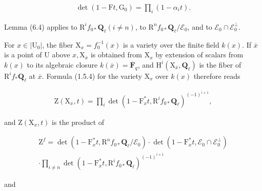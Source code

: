 \documentclass[10pt,leqno]{article}
\begin{document}
\begin{equation*}\begin{gathered}\operatorname{det}(1- \mathrm{F}t,\mathrm{G}_{0})=\prod _{i}(1- \alpha _{i} t).\end{gathered}\end{equation*}

\noindent Lemma (6.4) applies to \(\mathrm{R}^{i} f_{0*}\mathbf{Q}_{\ell } (i\ne n)\), to \(\mathrm{R}^{n} f_{0*}\mathbf{Q}_{\ell }/\mathcal{E} _{0}\), and to \(\mathcal{E} _{0}\cap \mathcal{E} _{0}^{\perp }\).\par

\noindent For \(x\in |\mathrm{U}_{0}|\), the fiber \(\mathrm{X}_{x}=f_{0}^{- 1}(x)\) is a variety over the finite field \(k(x)\). If \(\overline{x}\) is a point of \(\mathrm{U}\) above \(x, \mathrm{X}_{\overline{x}}\) is obtained from \(\mathrm{X}_{x}\) by extension of scalars from \(k(x)\) to its algebraic closure \(k(\overline{x})=\overline{\mathbf{F}}_{q}\), and \(\mathrm{H}^{i}(\mathrm{X}_{\overline{x}},\mathbf{Q}_{\ell })\) is the fiber of \(\mathrm{R}^{i} f_{*}\mathbf{Q}_{\ell }\) at \(\overline{x}\). Formula (1.5.4) for the variety \(\mathrm{X}_{x}\) over \(k(x)\) therefore reads\par

\begin{equation*}\begin{gathered}\mathrm{Z}(\mathrm{X}_{x},t)=\prod _{i} \operatorname{det}(1- \mathrm{F}_{x}^{*}t,\mathrm{R}^{i} f_{0*}\mathbf{Q}_{\ell })^{(- 1)^{i+1}},\end{gathered}\end{equation*}

\noindent and \(\mathrm{Z}(\mathrm{X}_{x},t)\) is the product of\par

\begin{equation*}\begin{gathered}\mathrm{Z}^{f}=\operatorname{det}(1- \mathrm{F}_{x}^{*}t,\mathrm{R}^{n} f_{0*}\mathbf{Q}_{\ell }/\mathcal{E} _{0})\cdot \operatorname{det}(1- \mathrm{F}_{x}^{*}t,\mathcal{E} _{0}\cap \mathcal{E} _{0}^{\perp }) \\ \cdot \prod _{i\ne n} \operatorname{det}(1- \mathrm{F}_{x}^{*}t,\mathrm{R}^{i} f_{0*}\mathbf{Q}_{\ell })^{(- 1)^{i+1}}\end{gathered}\end{equation*}

\noindent and\par
\end{document}
